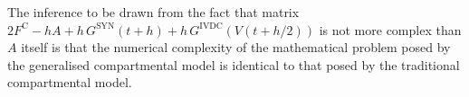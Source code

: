 The inference to be drawn from the fact that matrix $2
F^\mathrm{C}-hA+h\,G^\mathrm{SYN}(t+h)
+h\,G^\mathrm{IVDC}(V(t+h/2))$ is not more complex than $A$ itself
is that the numerical complexity of the mathematical problem posed
by the generalised compartmental model is identical to that posed
by the traditional compartmental model.
